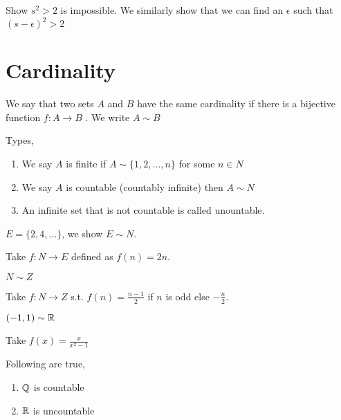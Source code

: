 \begin{ex}
   Show $s^2 > 2$  is impossible. We similarly show that we can find an $\epsilon$ such that  $(s - \epsilon)^2 > 2$
\end{ex}




\section{Cardinality} 

\begin{definition}
    We say that two  sets  $A$ and $B$ have the same cardinality if there is a bijective function  $f: A \to B$  . We write $A \sim B$
\end{definition}
\begin{remark}
    Types,
    \begin{enumerate}
        \item  We say $A$ is finite if $A \sim \{1, 2, \dots, n\} $ for some $n \in N$
        \item We say $A$ is countable  (countably infinite) then $A \sim N$
        \item An infinite set that is not countable is called unountable.
    \end{enumerate}
\end{remark}

\begin{eg}
$E = \{2, 4, \dots\}$, we show $E \sim N$.

Take  $f : N  \to E$ defined as  $f(n) =2n $.
\end{eg}
\begin{eg}
 $N \sim Z$

    Take $f: N \rightarrow Z$ s.t.  $f(n) = \frac{n - 1}{2} $ if $n$ is odd else $-\frac{n}{2}$.
\end{eg}
\begin{eg}
    $(-1, 1) \sim \mathbb{R}$  

    Take $f(x) = \frac{x}{x^2 - 1}$
\end{eg}

\begin{theorem}
    Following are true,
    \begin{enumerate}
        \item $\mathbb{Q}$ is countable
        \item $\mathbb{R}$ is uncountable
    \end{enumerate}
\end{theorem}

